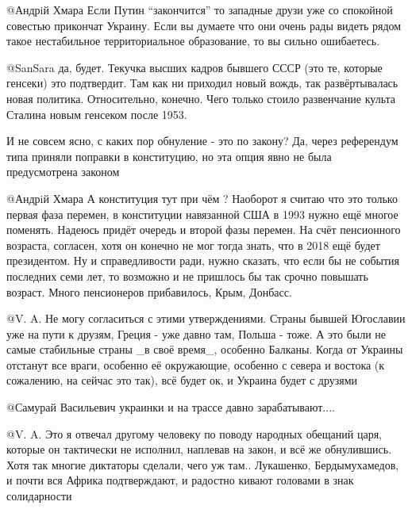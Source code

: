 \begin{itemize}
\begin{itemize}

@Андрiй Хмара  Если Путин \enquote{закончится} то западные друзи уже со спокойной
совестью прикончат Украину. Если вы думаете что они очень рады видеть рядом
такое нестабильное территориальное образование, то вы сильно ошибаетесь.


@SanSara  да, будет. Текучка высших кадров бывшего СССР (это те, которые
генсеки) это подтвердит. Там как ни приходил новый вождь, так развёртывалась
новая политика. Относительно, конечно. Чего только стоило развенчание культа
Сталина новым генсеком после 1953.

И не совсем ясно, с каких пор обнуление - это по закону? Да, через референдум
типа приняли поправки в конституцию, но эта опция явно не была предусмотрена
законом


@Андрiй Хмара  А конституция тут при чём ? Наоборот я считаю что это только
первая фаза перемен, в конституции навязанной США в 1993 нужно ещё многое
поменять. Надеюсь придёт очередь и второй фазы перемен. На счёт пенсионного
возраста, согласен, хотя он конечно не мог тогда знать, что в 2018 ещё
будет президентом. Ну и справедливости ради, нужно сказать, что если бы не
события последних семи лет, то возможно и не пришлось бы так срочно повышать
возраст. Много пенсионеров прибавилось, Крым, Донбасс.


@V. A.  Не могу согласиться с этими утверждениями. Страны бывшей Югославии уже
на пути к друзям, Греция - уже давно там, Польша - тоже. А это были не самые
стабильные страны \_в своё время\_, особенно Балканы. Когда от Украины отстанут
все враги, особенно её окружающие, особенно с севера и востока (к сожалению,
на сейчас это так), всё будет ок, и Украина будет с друзями


@Самурай Васильевич  украинки и на трассе давно зарабатывают....


@V. A.  Это я отвечал другому человеку по поводу народных обещаний царя,
которые он тактически не исполнил, наплевав на закон, и всё же обнулившись.
Хотя так многие диктаторы сделали, чего уж там.. Лукашенко, Бердымухамедов, и
почти вся Африка подтверждают, и радостно кивают головами в знак солидарности



\end{itemize}
\end{itemize}
